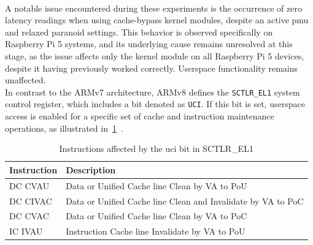         \\
        A notable issue encountered during these experiments is the occurrence of zero latency readings when using 
        cache-bypass kernel modules, despite an active \gls{pmu} and relaxed paranoid 
        settings. This behavior is observed specifically on Raspberry Pi 5 systems, and its underlying cause 
        remains unresolved at this stage, as the issue affects only the kernel module on all Raspberry Pi 5 devices, 
        despite it having previously worked correctly. Userspace functionality remains unaffected.
        \\
        In contrast to the ARMv7 architecture, ARMv8 defines the \texttt{SCTLR\_EL1} system control register, which includes 
        a bit denoted as \texttt{UCI}. If this bit is set, userspace access is enabled for a specific set of cache and 
        instruction maintenance operations, as illustrated in~\cref{tab:sctlr}~\cite{thesisCacheAttacksandRH, datasheetARMReferenceManual}.
        
        \begin{table}[h!]
            \centering
            \caption{Instructions affected by the \gls{uci} bit in SCTLR\_EL1}
            \label{tab:sctlr}
            \begin{tabular}{l l}
                \hline
                \textbf{Instruction} & \textbf{Description} \\ \hline
                DC CVAU & Data or Unified Cache line Clean by VA to PoU \\
                DC CIVAC & Data or Unified Cache line Clean and Invalidate by VA to PoC \\
                DC CVAC & Data or Unified Cache line Clean by VA to PoC \\
                IC IVAU & Instruction Cache line Invalidate by VA to PoU \\ \hline
            \end{tabular}
        \end{table}

